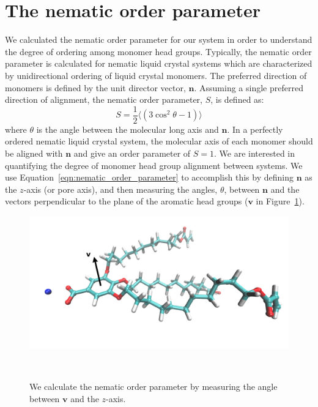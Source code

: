 \documentclass{article}
\begin{document}
  \clearpage
  \section{The nematic order parameter}\label{method:nematic_order}

  We calculated the nematic order parameter for our system in order to
  understand the degree of ordering among monomer head groups. Typically, the
  nematic order parameter is calculated for nematic liquid crystal systems which
  are characterized by unidirectional ordering of liquid crystal monomers. The
  preferred direction of monomers is defined by the unit director vector,
  $\mathbf{n}$. Assuming a single preferred direction of alignment, the nematic
  order parameter, $S$, is defined as:~\cite{chaikin_principles_1995}
  \begin{equation}
	 S = \frac{1}{2} \langle(3\cos^2\theta -1)\rangle
	\label{eqn:nematic_order_parameter}
  \end{equation}
  where $\theta$ is the angle between the molecular long axis and $\mathbf{n}$.
  In a perfectly ordered nematic liquid crystal system, the molecular axis of each
  monomer should be aligned with $\mathbf{n}$ and give an order parameter of $S=1$. 
  We are interested in quantifying the degree of monomer head group alignment 
  between systems. We use Equation~\ref{eqn:nematic_order_parameter} to accomplish this
  by defining $\mathbf{n}$ as the $z$-axis (or pore axis), and then measuring the angles,
  $\theta$, between $\mathbf{n}$ and the vectors perpendicular to the plane of
  the aromatic head groups ($\mathbf{v}$ in Figure~\ref{fig:director}). 
  
  \begin{figure}[!htb]
  \centering
  \includegraphics[width=0.75\linewidth]{nematic_director.png}
  \caption{We calculate the nematic order parameter by measuring the angle
  between $\mathbf{v}$ and the $z$-axis.}~\label{fig:director}
  \end{figure}
\end{document}
